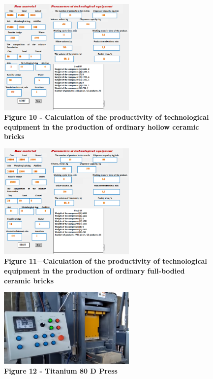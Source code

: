 \begin{figure}[H]
	\centering
	\includegraphics[width=0.6\textwidth]{assets/276}
	\caption*{\bfseries Figure 10 - Calculation of the productivity of technological
	equipment in the production of ordinary hollow ceramic bricks}
\end{figure}



\begin{figure}[H]
	\centering
	\includegraphics[width=0.6\textwidth]{assets/277}
	\caption*{\bfseries Figure 11−Calculation of the productivity of technological
	equipment in the production of ordinary full-bodied ceramic bricks}
\end{figure}



\begin{figure}[H]
	\centering
	\includegraphics[width=0.6\textwidth]{assets/278}
	\caption*{\bfseries Figure 12 - Titanium 80 D Press}
\end{figure}

